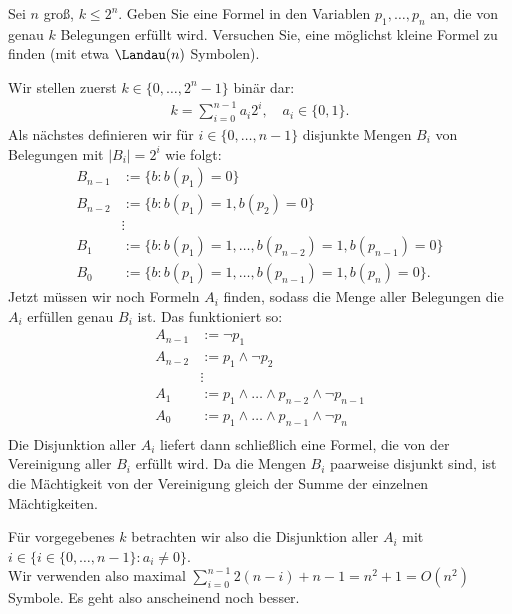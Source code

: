 
\begin{exercise}[24]

Sei $n$ groß, $k \leq 2^n$.
Geben Sie eine Formel in den Variablen $p_1, \dots, p_n$ an, die von genau $k$ Belegungen erfüllt wird.
Versuchen Sie, eine möglichst kleine Formel zu finden (mit etwa $\Landau(n)$ Symbolen).

\end{exercise}


\begin{solution}

Wir stellen zuerst $k \in \{0,\dots,2^n-1\}$ binär dar:
\begin{align*}
  k = \sum_{i=0}^{n-1}a_i2^i, \quad a_i \in \{0,1\}.
\end{align*}
Als nächstes definieren wir für $i \in \{0,\dots,n-1\}$ disjunkte Mengen $B_i$
von Belegungen mit $|B_i| = 2^i$ wie folgt:
\begin{align*}
  B_{n-1} &:= \{b: b(p_1) = 0\} \\
  B_{n-2} &:= \{b: b(p_1) = 1, b(p_2) = 0\} \\
  &\vdots \\
  B_{1} &:= \{b: b(p_1) = 1, \dots, b(p_{n-2}) = 1, b(p_{n-1}) = 0\} \\
  B_{0} &:= \{b: b(p_1) = 1, \dots, b(p_{n-1}) = 1, b(p_{n}) = 0\}.
\end{align*}
Jetzt müssen wir noch Formeln $A_i$ finden, sodass die Menge aller Belegungen die $A_i$
erfüllen genau $B_i$ ist. Das funktioniert so:
\begin{align*}
  A_{n-1} &:= \neg p_1 \\
  A_{n-2} &:= p_1 \land \neg p_2 \\
  &\vdots \\
  A_{1} &:= p_1 \land \dots \land p_{n-2} \land \neg p_{n-1}\\
  A_{0} &:= p_1 \land \dots \land p_{n-1} \land \neg p_{n}\\
\end{align*}
Die Disjunktion aller $A_i$ liefert dann schließlich eine Formel, die von der
Vereinigung aller $B_i$ erfüllt wird.
Da die Mengen $B_i$ paarweise disjunkt sind, ist die Mächtigkeit von der Vereinigung
gleich der Summe der einzelnen Mächtigkeiten.

Für vorgegebenes $k$ betrachten wir also die Disjunktion aller $A_i$ mit $i \in \{i \in \{0,\dots,n-1\}: a_i \neq 0 \}$. \\
Wir verwenden also maximal $\sum_{i=0}^{n-1}2(n-i) + n - 1 = n^2 + 1 = O(n^2)$ Symbole. Es geht also anscheinend noch besser.


\end{solution}
